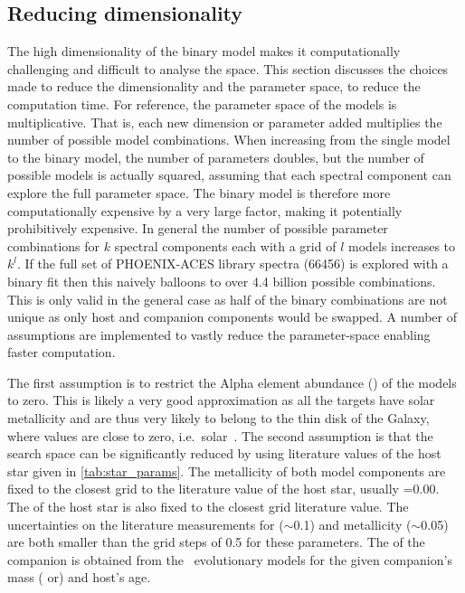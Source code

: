 \subsection{Reducing dimensionality}
\label{subsec:reduce-params}
The high dimensionality of the binary model makes it computationally challenging and difficult to analyse the \textchisquared{} space.
This section discusses the choices made to reduce the dimensionality and the parameter space, to reduce the computation time.
For reference, the parameter space of the models is multiplicative.
That is, each new dimension or parameter added multiplies the number of possible model combinations.
When increasing from the single model to the binary model, the number of parameters doubles, but the number of possible models is actually squared, assuming that each spectral component can explore the full parameter space.
The binary model is therefore more computationally expensive by a very large factor, making it potentially prohibitively expensive.
In general the number of possible parameter combinations for \(k\) spectral components each with a grid of \(l\) models increases to \({k}^{l}\).
If the full set of {PHOENIX-ACES} library spectra (66456) is explored with a binary fit then this naively balloons to over 4.4 billion possible combinations.
This is only valid in the general case as half of the binary combinations are not unique as only host and companion components would be swapped.
A number of assumptions are implemented to vastly reduce the parameter-space enabling faster computation.

The first assumption is to restrict the Alpha element abundance (\alphafe{}) of the models to zero.
This is likely a very good approximation as all the targets have solar metallicity and are thus very likely to belong to the thin disk of the Galaxy, where \alphafe{} values are close to zero, i.e.\ solar~\citet[e.g.][]{adibekyan_chemical_2012}.
The second assumption is that the search space can be significantly reduced by using literature values of the host star given in \cref{tab:star_params}.
The metallicity of both model components are fixed to the closest grid to the literature value of the host star, usually \feh{}=0.00.
The \Logg{} of the host star is also fixed to the closest grid literature value.
The uncertainties on the literature measurements for \Logg{} (\(\sim\)0.1) and metallicity (\(\sim\)0.05) are both smaller than the grid steps of 0.5 for these parameters.
The \Logg{} of the companion is obtained from the~\citet{baraffe_evolutionary_2003,baraffe_new_2015} evolutionary models for the given companion's mass (\Mtwo{} or\Mtwosini{}) and host's age.

